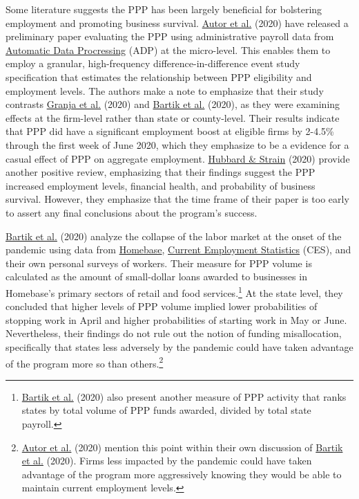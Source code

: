 \documentclass[11pt]{article} %
\begin{document}
Some literature suggests the PPP has been largely beneficial for bolstering employment and promoting business survival. \hyperlink{Autor}{Autor et al.} (2020) have released a preliminary paper evaluating the PPP using administrative payroll data from \href{https://www.adp.com/}{Automatic Data Procressing} (ADP) at the micro-level. This enables them to employ a granular, high-frequency difference-in-difference event study specification that estimates the relationship between PPP eligibility and employment levels. The authors make a note to emphasize that their study contrasts \hyperlink{Granja}{Granja et al.} (2020) and \hyperlink{Bartik}{Bartik et al.} (2020), as they were examining effects at the firm-level rather than state or county-level. Their results indicate that PPP did have a significant employment boost at eligible firms by 2-4.5\% through the first week of June 2020, which they emphasize to be a evidence for a casual effect of PPP on aggregate employment. \hyperlink{Hubbard}{Hubbard \& Strain} (2020) provide another positive review, emphasizing that their findings suggest the PPP increased employment levels, financial health, and probability of business survival. However, they emphasize that the time frame of their paper is too early to assert any final conclusions about the program's success.

\hyperlink{Bartik}{Bartik et al.} (2020) analyze the collapse of the labor market at the onset of the pandemic using data from \href{https://app.joinhomebase.com/accounts/sign-in}{Homebase}, \href{https://www.bls.gov/ces/data/}{Current Employment Statistics} (CES), and their own personal surveys of workers. Their measure for PPP volume is calculated as the amount of small-dollar loans awarded to businesses in Homebase's primary sectors of retail and food services.\footnote{\hyperlink{Bartik}{Bartik et al.} (2020) also present another measure of PPP activity that ranks states by total volume of PPP funds awarded, divided by total state payroll.} At the state level, they concluded that higher levels of PPP volume implied lower probabilities of stopping work in April and higher probabilities of starting work in May or June. Nevertheless, their findings do not rule out the notion of funding misallocation, specifically that states less adversely by the pandemic could have taken advantage of the program more so than others.\footnote{\hyperlink{Autor}{Autor et al.} (2020) mention this point within their own discussion of \hyperlink{Bartik}{Bartik et al.} (2020). Firms less impacted by the pandemic could have taken advantage of the program more aggressively knowing they would be able to maintain current employment levels. }
\end{document}
